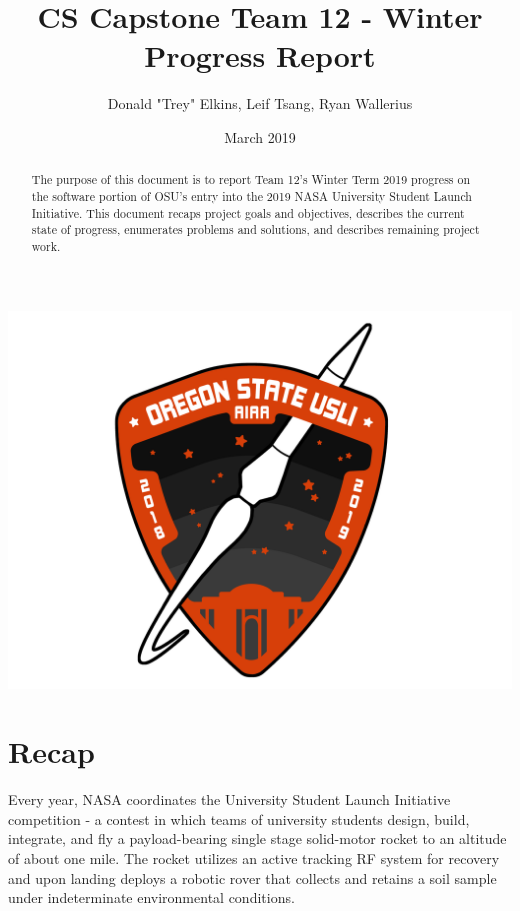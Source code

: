 \documentclass[journal,10pt,draftclsnofoot,onecolumn,compsoc]{IEEEtran} \usepackage[margin=0.75in]{geometry}
\title{CS Capstone Team 12 - Winter Progress Report}
\author{Donald "Trey" Elkins, Leif Tsang, Ryan Wallerius}
\date{March 2019}
\begin{document}
\begin{titlingpage}

\maketitle
\begin{center}

\includegraphics[scale = 0.25]{FinalPatch.png}\\[1.0 cm]
\end{center}
\begin{abstract}
The purpose of this document is to report Team 12's Winter Term 2019 progress on the software portion of OSU's entry into the 2019 NASA University Student Launch Initiative. This document recaps project goals and objectives, describes the current state of progress, enumerates problems and solutions, and describes remaining project work.
\end{abstract}
\end{titlingpage}

\section{Recap}
Every year, NASA coordinates the University Student Launch Initiative competition - a contest in which teams of university students design, build, integrate, and fly a payload-bearing single stage solid-motor rocket to an altitude of about one mile. The rocket utilizes an active tracking RF system for recovery and upon landing deploys a robotic rover that collects and retains a soil sample under indeterminate environmental conditions. \newline
\end{document}
